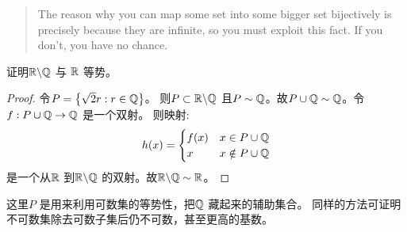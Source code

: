 \begin{quote}
    The reason why you can map some set into some bigger
    set bijectively is precisely because they are infinite,
    so you must exploit this fact. If you don't, you have no chance.
\end{quote}

\begin{problem}
    证明\(\mathbb{R}\backslash \mathbb{Q} \) 与 \(\mathbb{R}\) 等势。
\end{problem}

\begin{proof}
    令\(P=\left\{ \sqrt{2}r:r \in \mathbb{Q} \right\} \)。
    则\(P \subset \mathbb{R}\backslash \mathbb{Q}\) 且\(P\sim
    \mathbb{Q}\)。故\(P\cup \mathbb{Q}\sim \mathbb{Q}\)。令\(f: P\cup \mathbb{Q} \to \mathbb{Q}\) 是一个双射。
    则映射: \[
        h(x) =
        \begin{cases}
            f(x) & x\in P\cup \mathbb{Q} \\
            x & x \notin P\cup \mathbb{Q}
        \end{cases}
    \]
    是一个从\(\mathbb{R}\) 到\(\mathbb{R}\backslash \mathbb{Q}\) 的双射。故\(\mathbb{R}\backslash
    \mathbb{Q} \sim \mathbb{R}\)。
\end{proof}

这里\(P\) 是用来利用可数集的等势性，把\(\mathbb{Q}\) 藏起来的辅助集合。
同样的方法可证明不可数集除去可数子集后仍不可数，甚至更高的基数。







